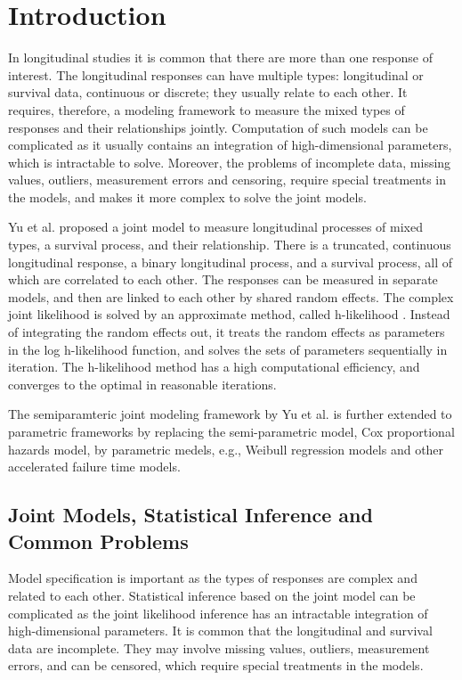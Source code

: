 \section{Introduction}
\label{sec:intro}



In longitudinal studies it is common that there are more than one response of interest. The longitudinal responses can have multiple types: longitudinal or survival data, continuous or discrete; they usually relate to each other. It requires, therefore, a modeling framework to measure the mixed types of responses and their relationships jointly. Computation of such models can be complicated as it usually contains an integration of high-dimensional parameters, which is intractable to solve.
Moreover, the problems of incomplete data, missing values, outliers, measurement errors and censoring, require special treatments in the models, and makes it more complex to solve the joint models.



Yu et al. \cite{yu2018joint} proposed a joint model to measure longitudinal processes of mixed types, a survival process, and their relationship. There is a truncated, continuous longitudinal response, a binary longitudinal process, and a survival process, all of which are correlated to each other. The responses can be measured in separate models, and then are linked to each other by shared random effects. The complex joint likelihood is solved by an approximate method, called  h-likelihood \cite{molas2013joint,ha2003joint,lee2018generalized}. Instead  of integrating the random effects out, it treats the random effects as parameters in the log h-likelihood function, and solves the sets of parameters sequentially in iteration. The h-likelihood method has a high computational efficiency, and converges to the optimal in reasonable iterations.

The semiparamteric joint modeling framework by Yu et al. \cite{yu2018joint} is further extended to parametric frameworks by replacing the semi-parametric model, Cox proportional hazards model, by parametric medels, e.g., Weibull regression models and other accelerated failure time models.

\subsection{Joint Models, Statistical Inference and Common Problems}

Model specification is important as the types of responses are complex and related to each other. Statistical inference based on the joint model can be complicated as the joint likelihood inference has an intractable integration of high-dimensional parameters. It is common that the longitudinal and survival data are incomplete. They may involve missing values, outliers, measurement errors, and can be censored, which require special treatments in the models.


